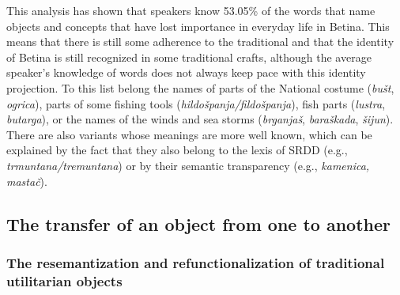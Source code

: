 \documentclass[output=paper]{LSP/langsci}
\begin{document}
% 
% 




This analysis has shown that speakers know 53.05\% of the words that name objects and concepts that have lost importance in everyday life in Betina. This means that there is still some adherence to the traditional and that the identity of Betina is still recognized in some traditional crafts, although the average speaker’s knowledge of words does not always keep pace with this identity projection. To this list belong the names of parts of the National costume (\textit{bušt}, \textit{ogrica}), parts of some fishing tools (\textit{hildošpanja/fildošpanja}), fish parts (\textit{lustra}, \textit{butarga}), or the names of the winds and sea storms (\textit{brganjaš}, \textit{baraškada}, \textit{šijun}). There are also variants whose meanings are more well known, which can be explained by the fact that they also belong to the lexis of SRDD (e.g., \textit{trmuntana/tremuntana}) or by their semantic transparency (e.g., \textit{kamenica, mastač}). 

\subsection{The transfer of an object from one  to another}
\subsubsection{The resemantization and refunctionalization of traditional utilitarian objects}
\end{document}
